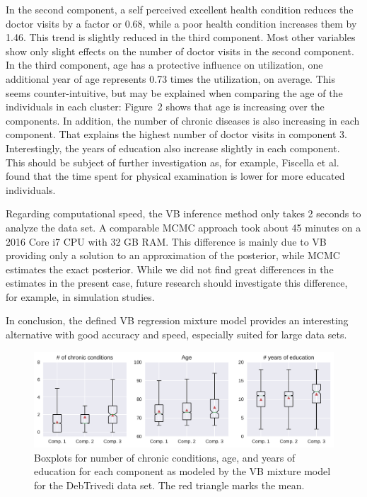 \documentclass[a4paper,UKenglish]{oasics}
\begin{document}
In the second component, a self perceived excellent health condition reduces the doctor visits by a factor or 0.68, while a poor health condition increases them by 1.46. This trend is slightly reduced in the third component. Most other variables show only slight effects on the number of doctor visits in the second component. In the third component, age has a protective influence on utilization, one additional year of age represents 0.73 times the utilization, on average. This seems counter-intuitive, but may be explained when comparing the age of the individuals in each cluster: Figure~2 shows that age is increasing over the components. In addition, the number of chronic diseases is also increasing in each component. That explains the highest number of doctor visits in component 3. Interestingly, the years of education also increase slightly in each component. This should be subject of further investigation as, for example, Fiscella et al.~\cite{fiscella} found that the time spent for physical examination is lower for more educated individuals.

Regarding computational speed, the VB inference method only takes 2 seconds to analyze the data set. A comparable MCMC approach took about 45 minutes on a 2016 Core i7 CPU with 32 GB RAM. This difference is mainly due to VB providing only a solution to an approximation of the posterior, while MCMC estimates the exact posterior. While we did not find great differences in the estimates in the present case, future research should investigate this difference, for example, in simulation studies.

In conclusion, the defined VB regression mixture model provides an interesting alternative with good accuracy and speed, especially suited for large data sets.

\begin{figure}[!ht]\centering
	\includegraphics[width=\linewidth]{boxplot.pdf}
	\caption{\label{boxplot} Boxplots for number of chronic conditions, age, and years of education for each component as modeled by the VB mixture model for the DebTrivedi data set. The red triangle marks the mean.}
\end{figure}
\end{document}
